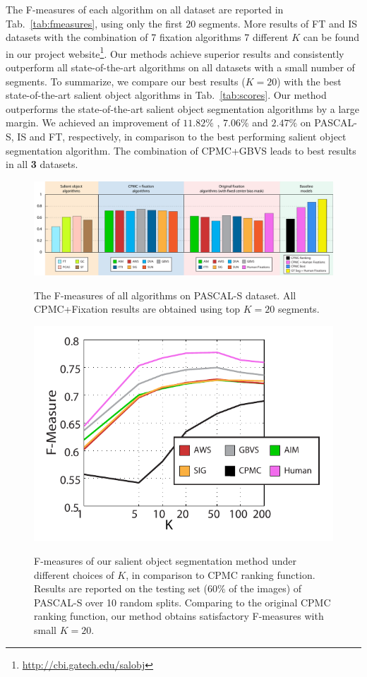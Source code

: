The F-measures of each algorithm on all dataset are reported in Tab.~\ref{tab:fmeasures}, using only the first $20$ segments. More results of FT and IS datasets with the combination of 7 fixation algorithms 7 different $K$ can be found in our project website\footnote{\href{http://cbi.gatech.edu/salobj}{http://cbi.gatech.edu/salobj}}. Our methods achieve superior results and consistently outperform all state-of-the-art algorithms on all datasets with a small number of segments. To summarize, we compare our best results ($K=20$) with the best state-of-the-art salient object algorithms in Tab.~\ref{tab:scores}. Our method outperforms the state-of-the-art salient object segmentation algorithms by a large margin. We achieved an improvement of $11.82\%$ , $7.06\%$ and $2.47\%$ on PASCAL-S, IS and FT, respectively, in comparison to the best performing salient object segmentation algorithm. The combination of CPMC+GBVS leads to best results in all \textbf{3} datasets.

\begin{figure}[htbp]
\centering
\includegraphics[width=\linewidth]{bigbigFig.pdf}\\
\caption{The F-measures of all algorithms on PASCAL-S dataset.  All CPMC+Fixation results are obtained using top $K=20$ segments.} \label{fig:finalResult}
\end{figure}

\begin{figure}[htbp]
\centering
\includegraphics[width=0.6\linewidth]{lastFigCam.pdf}\\
\caption{F-measures of our salient object segmentation method under different choices of $K$, in comparison to CPMC ranking function. Results are reported on the testing set ($60\%$ of the images) of PASCAL-S over 10 random splits. Comparing to the original CPMC ranking function, our method obtains satisfactory F-measures with small $K=20$. } \label{fig:lastFig}
\end{figure}


